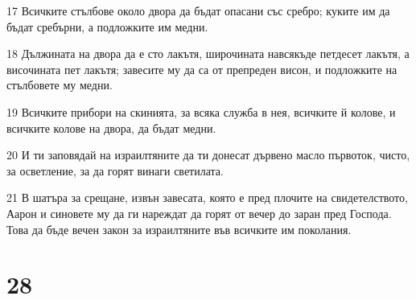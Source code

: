 \par 17 Всичките стълбове около двора да бъдат опасани със сребро; куките им да бъдат сребърни, а подложките им медни.
\par 18 Дължината на двора да е сто лакътя, широчината навсякъде петдесет лакътя, а височината пет лакътя; завесите му да са от препреден висон, и подложките на стълбовете му медни.
\par 19 Всичките прибори на скинията, за всяка служба в нея, всичките й колове, и всичките колове на двора, да бъдат медни.
\par 20 И ти заповядай на израилтяните да ти донесат дървено масло първоток, чисто, за осветление, за да горят винаги светилата.
\par 21 В шатъра за срещане, извън завесата, която е пред плочите на свидетелството, Аарон и синовете му да ги нареждат да горят от вечер до заран пред Господа. Това да бъде вечен закон за израилтяните във всичките им поколания.

\chapter{28}

